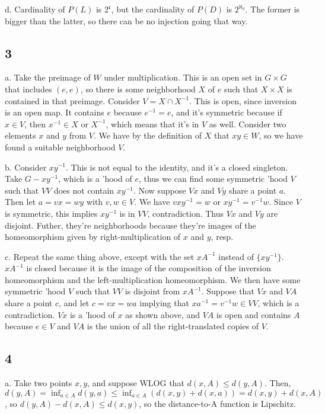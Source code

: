 \documentclass{article}
\begin{document}
d. Cardinality of $P(L)$ is $2^\mathfrak{c}$, but the cardinality of $P(D)$ is $2^{\aleph_0}$. The former is bigger than the latter, so there can be no injection going that way.

\subsection*{3}
a. Take the preimage of $W$ under multiplication. This is an open set in $G\times G$ that includes $(e,e)$, so there is some neighborhood $X$ of $e$ such that $X\times X$ is contained in that preimage. Consider $V=X\cap X^{-1}$. This is open, since inversion is an open map. It contains $e$ because $e^{-1}=e$, and it's symmetric because if $x\in V$, then $x^{-1}\in X$ or $X^{-1}$, which means that it's in $V$ as well. Consider two elements $x$ and $y$ from $V$. We have by the definition of $X$ that $xy\in W$, so we have found a suitable neighborhood $V$.

b. Consider $xy^{-1}$. This is not equal to the identity, and it's a closed singleton. Take $G-xy^{-1}$, which is a 'hood of $e$, thus we can find some symmetric 'hood $V$ such that $VV$ does not contain $xy^{-1}$. Now suppose $Vx$ and $Vy$ share a point $a$. Then let $a=vx=wy$ with $v,w\in V$. We have $vxy^{-1}=w$ or $xy^{-1}=v^{-1}w$. Since $V$ is symmetric, this implies $xy^{-1}$ is in $VV$, contradiction. Thus $Vx$ and $Vy$ are disjoint. Futher, they're neighborhoods because they're images of the homeomorphism given by right-multiplication of $x$ and $y$, resp.

c. Repeat the same thing above, except with the set $xA^{-1}$ instead of $\{xy^{-1}\}$. $xA^{-1}$ is closed because it is the image of the composition of the inversion homeomorphism and the left-multiplication homeomorphism. We then have some symmetric 'hood $V$ such that $VV$ is disjoint from $xA^{-1}$. Suppose that $Vx$ and $VA$ share a point $c$, and let $c=vx=wa$ implying that $xa^{-1}=v^{-1}w\in VV$, which is a contradiction. $Vx$ is a 'hood of $x$ as shown above, and $VA$ is open and contains $A$ because $e\in V$ and $VA$ is the union of all the right-translated copies of $V$.

\subsection*{4}
a. Take two points $x,y$, and suppose WLOG that $d(x,A)\leq d(y,A)$. Then, $d(y,A)=\inf_{a\in A}d(y,a)\leq\inf_{a\in A}(d(x,y)+d(x,a))=d(x,y)+d(x,A)$, so $d(y,A)-d(x,A)\leq d(x,y)$, so the distance-to-A function is Lipschitz.
\end{document}

